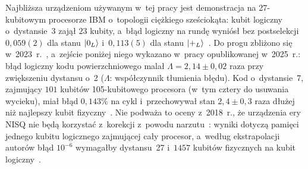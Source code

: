 Najbliższa urządzeniom używanym w~tej pracy jest demonstracja na 27-kubitowym procesorze IBM o~topologii ciężkiego sześciokąta: kubit logiczny o~dystansie~3 zajął $23$ kubity, a~błąd logiczny na rundę wyniósł bez postselekcji $0{,}059(2)$ dla stanu $\ket{0_L}$ i~$0{,}113(5)$ dla stanu $\ket{+_L}$~\cite{sundaresan_demonstrating_2023}.
Do progu zbliżono się w~2023~r.~\cite{google_suppressing_2023}, a~zejście poniżej niego wykazano w~pracy opublikowanej w~2025~r.: błąd logiczny kodu powierzchniowego malał $\Lambda=2{,}14\pm0{,}02$ raza przy zwiększeniu dystansu o~2 ($\Lambda$: współczynnik tłumienia błędu).
Kod o~dystansie~7, zajmujący $101$ kubitów 105-kubitowego procesora (w~tym cztery do usuwania wycieku), miał błąd $0{,}143\%$ na cykl i~przechowywał stan $2{,}4\pm0{,}3$ raza dłużej niż najlepszy kubit fizyczny~\cite{google_quantum_2025}.
Nie podważa to oceny z~2018~r., że urządzenia ery NISQ nie będą korzystać z~korekcji z~powodu narzutu~\cite{preskill_quantum_2018}: wyniki dotyczą pamięci jednego kubitu logicznego zajmującej cały procesor, a~według ekstrapolacji autorów błąd $10^{-6}$ wymagałby dystansu~27 i~$1457$ kubitów fizycznych na kubit logiczny~\cite{google_quantum_2025}.

